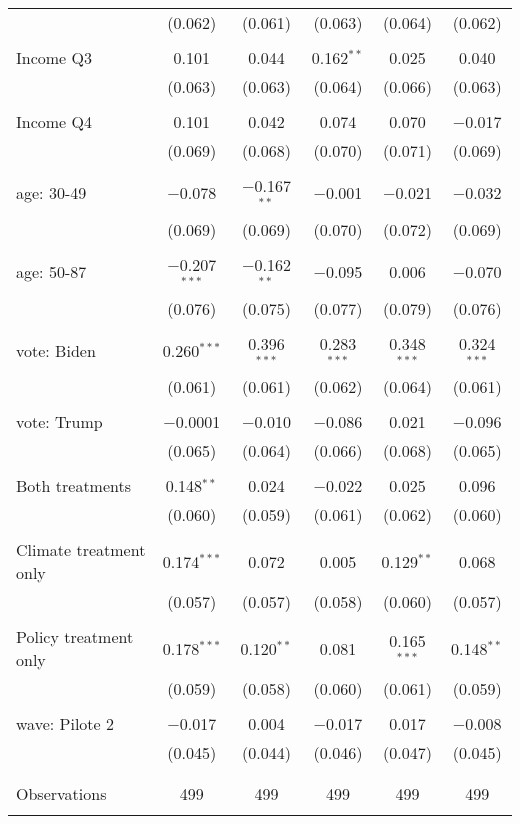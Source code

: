 \begin{tabular}{@{\extracolsep{5pt}}lccccc}
  & (0.062) & (0.061) & (0.063) & (0.064) & (0.062) \\ 
  & & & & & \\ 
 Income Q3 & 0.101 & 0.044 & 0.162$^{**}$ & 0.025 & 0.040 \\ 
  & (0.063) & (0.063) & (0.064) & (0.066) & (0.063) \\ 
  & & & & & \\ 
 Income Q4 & 0.101 & 0.042 & 0.074 & 0.070 & $-$0.017 \\ 
  & (0.069) & (0.068) & (0.070) & (0.071) & (0.069) \\ 
  & & & & & \\ 
 age: 30-49 & $-$0.078 & $-$0.167$^{**}$ & $-$0.001 & $-$0.021 & $-$0.032 \\ 
  & (0.069) & (0.069) & (0.070) & (0.072) & (0.069) \\ 
  & & & & & \\ 
 age: 50-87 & $-$0.207$^{***}$ & $-$0.162$^{**}$ & $-$0.095 & 0.006 & $-$0.070 \\ 
  & (0.076) & (0.075) & (0.077) & (0.079) & (0.076) \\ 
  & & & & & \\ 
 vote: Biden & 0.260$^{***}$ & 0.396$^{***}$ & 0.283$^{***}$ & 0.348$^{***}$ & 0.324$^{***}$ \\ 
  & (0.061) & (0.061) & (0.062) & (0.064) & (0.061) \\ 
  & & & & & \\ 
 vote: Trump & $-$0.0001 & $-$0.010 & $-$0.086 & 0.021 & $-$0.096 \\ 
  & (0.065) & (0.064) & (0.066) & (0.068) & (0.065) \\ 
  & & & & & \\ 
 Both treatments & 0.148$^{**}$ & 0.024 & $-$0.022 & 0.025 & 0.096 \\ 
  & (0.060) & (0.059) & (0.061) & (0.062) & (0.060) \\ 
  & & & & & \\ 
 Climate treatment only & 0.174$^{***}$ & 0.072 & 0.005 & 0.129$^{**}$ & 0.068 \\ 
  & (0.057) & (0.057) & (0.058) & (0.060) & (0.057) \\ 
  & & & & & \\ 
 Policy treatment only & 0.178$^{***}$ & 0.120$^{**}$ & 0.081 & 0.165$^{***}$ & 0.148$^{**}$ \\ 
  & (0.059) & (0.058) & (0.060) & (0.061) & (0.059) \\ 
  & & & & & \\ 
 wave: Pilote 2 & $-$0.017 & 0.004 & $-$0.017 & 0.017 & $-$0.008 \\ 
  & (0.045) & (0.044) & (0.046) & (0.047) & (0.045) \\ 
  & & & & & \\ 
\hline \\[-1.8ex] 

Observations & 499 & 499 & 499 & 499 & 499 \\ 
\hline 
\hline \\[-1.8ex] 
\end{tabular} 